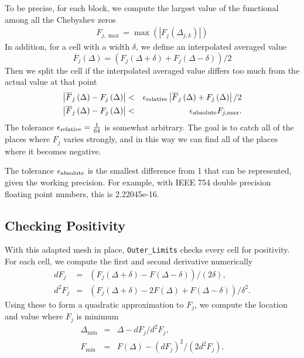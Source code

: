 \documentclass[12pt]{article}
\numberwithin{equation}{section}
\begin{document}
To be precise, for each block, we compute the largest value of the
functional among all the Chebyshev zeros
\begin{eqnarray}
  F_{j,\max} = \max \left( \left| F_{j} \left(\Delta_{j,k} \right) \right| \right)
\end{eqnarray}
In addition, for a cell with a width $\delta$, we define an interpolated averaged value
\begin{equation}
  \overline{F}_j\left(\Delta\right) = \left( F_j\left(\Delta + \delta\right) + F_j\left(\Delta - \delta\right) \right) /2
\end{equation}
Then we split the cell if the interpolated averaged value differs too
much from the actual value at that point
\begin{eqnarray}
  \left|\overline{F}_j\left(\Delta\right) - F_j\left(\Delta\right)\right| & < & \epsilon_{\rm{relative}} \left|\overline{F}_j\left(\Delta\right) + F_j\left(\Delta\right)\right| /2\\
  \left|\overline{F}_j\left(\Delta\right) - F_j\left(\Delta\right)\right| & < & \epsilon_{\rm{absolute}} F_{j,\max}.
\end{eqnarray}
The tolerance $\epsilon_{\rm{relative}}=\frac{1}{64}$ is somewhat
arbitrary.  The goal is to catch all of the places where $F_j$ varies
strongly, and in this way we can find all of the places where it
becomes negative.

The tolerance $\epsilon_{\rm{absolute}}$ is the smallest difference from 1
that can be represented, given the working precision.  For example,
with IEEE 754 double precision floating point numbers, this is
2.22045e-16.

\subsection{Checking Positivity}
\label{subsec:checkingpositivity}

With this adapted mesh in place, \texttt{Outer\_Limits} checks every
cell for positivity. For each cell, we compute the first and
second derivative numerically
\begin{eqnarray}
  dF_{j} & = &\left( F_{j}\left( \Delta + \delta \right) - F\left( \Delta - \delta \right) \right)/\left( 2 \delta \right),\\
  d^{2}F_{j} & = & \left( F_{j}\left( \Delta + \delta \right) - 2 F\left( \Delta \right) + F\left( \Delta - \delta \right) \right)/ \delta^2.
\end{eqnarray}
Using these to form a quadratic approximation to $F_{j}$, we compute
the location and value where $F_{j}$ is minimum
\begin{eqnarray}
  \Delta_{\min} & = & \Delta - dF_{j}/d^{2}F_{j},\\
  F_{\min} & = & F\left(\Delta\right) - \left(dF_{j}\right)^{2} /\left( 2 d^{2}F_{j}\right).
\end{eqnarray}
\end{document}
